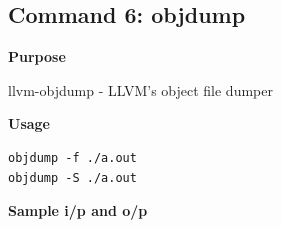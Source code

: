 \subsection{Command 6: objdump} 
\textbf{Purpose}
\begin{flushleft}
       llvm-objdump - LLVM's object file dumper
\end{flushleft}
\textbf{Usage}
\begin{verbatim}
objdump -f ./a.out
objdump -S ./a.out
\end{verbatim}
\textbf{Sample i/p and o/p}
\begin{figure}[H] 
\end{figure}
